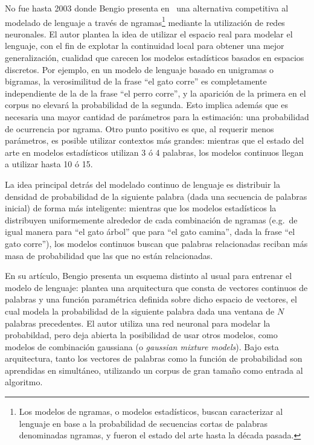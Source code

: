 No fue hasta 2003 donde Bengio presenta en~\cite{Bengio2003} una alternativa competitiva al modelado
de lenguaje a través de ngramas\footnote{Los modelos de ngramas, o modelos estadísticos, buscan
caracterizar al lenguaje en base a la probabilidad de secuencias cortas de palabras denominadas
ngramas, y fueron el estado del arte hasta la década pasada.} mediante la utilización de redes
neuronales. El autor plantea la idea de utilizar el espacio real para modelar el lenguaje, con el
fin de explotar la continuidad local para obtener una mejor generalización, cualidad que carecen los
modelos estadísticos basados en espacios discretos. Por ejemplo, en un modelo de lenguaje basado en
unigramas o bigramas, la verosimilitud de la frase ``el gato corre'' es completamente independiente
de la de la frase ``el perro corre'', y la aparición de la primera en el corpus no elevará la
probabilidad de la segunda. Esto implica además que es necesaria una mayor cantidad de parámetros
para la estimación: una probabilidad de ocurrencia por ngrama. Otro punto positivo es que, al
requerir menos parámetros, es posible utilizar contextos más grandes: mientras que el estado del
arte en modelos estadísticos utilizan 3 ó 4 palabras, los modelos continuos llegan a utilizar hasta
10 ó 15.

La idea principal detrás del modelado continuo de lenguaje es distribuir la densidad de probabilidad de
la siguiente palabra (dada una secuencia de palabras inicial) de forma más inteligente: mientras que
los modelos estadísticos la distribuyen uniformemente alrededor de cada combinación de ngramas
(e.g.\ de igual manera para ``el gato árbol'' que para ``el gato camina'', dada la frase ``el gato
corre''), los modelos continuos buscan que palabras relacionadas reciban más masa de probabilidad
que las que no están relacionadas.

En su artículo, Bengio presenta un esquema distinto al usual para entrenar el modelo de lenguaje:
plantea una arquitectura que consta de vectores continuos de palabras y una función paramétrica
definida sobre dicho espacio de vectores, el cual modela la probabilidad de la siguiente palabra
dada una ventana de $N$ palabras precedentes. El autor utiliza una red neuronal para modelar la
probabildad, pero deja abierta la posibilidad de usar otros modelos, como modelos de combinación gaussiana
(o \textit{gaussian mixture models}). Bajo esta arquitectura, tanto los vectores de palabras como la
función de probabilidad son aprendidas en simultáneo, utilizando un corpus de gran tamaño como
entrada al algoritmo.

